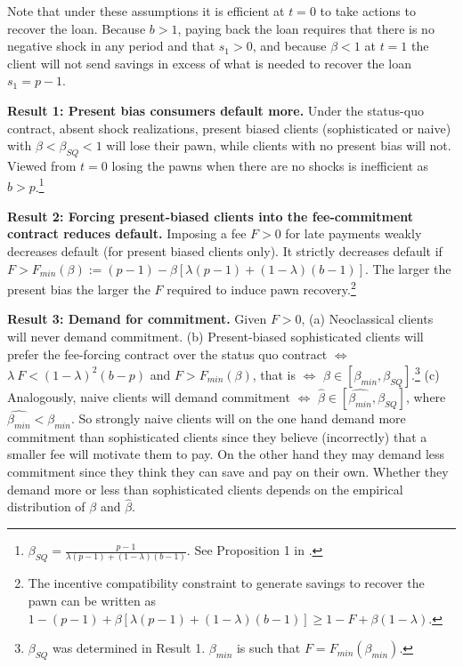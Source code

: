 \documentclass[11pt]{article}
\begin{document}
Note that under these assumptions it is efficient at $t=0$ to take actions to recover the loan. Because $b>1$, paying back the loan requires that there is no negative shock in any period and that $s_1>0$, and because $\beta<1$ at $t=1$ the client will not send savings in excess of what is needed to recover the loan $s_1=p-1$.

\vspace{.1in}
\noindent \textbf{Result 1: Present bias consumers default more.} Under the status-quo contract, absent shock realizations, present biased clients (sophisticated or naive) with $\beta<\beta_{SQ}<1$ will lose their pawn, while clients with no present bias will not. Viewed from $t=0$ losing the pawns when there are no shocks is inefficient as $b>p$.\footnote{$\beta_{SQ}=\frac{p-1}{\lambda(p-1)+(1-\lambda)(b-1)}$. See Proposition 1 in \cite{John}.} 

\vspace{.1in}
\noindent \textbf{Result 2: Forcing present-biased clients into the fee-commitment contract reduces default.} Imposing a fee $F>0$ for late payments weakly decreases default (for present biased clients only). It strictly decreases default if $F>F_{min}(\beta):=(p-1)-\beta[\lambda(p-1)+(1-\lambda)(b-1)]$. The larger the present bias the larger the $F$ required to induce pawn recovery.\footnote{The incentive compatibility constraint to generate savings to recover the pawn can be written as $1-(p-1)+\beta[\lambda(p-1)+(1-\lambda)(b-1)] \geq 1-F+\beta(1-\lambda)$.}

\vspace{.1in}
\noindent \textbf{Result 3: Demand for commitment.} Given $F>0$, (a) Neoclassical clients will never demand commitment. (b) Present-biased sophisticated clients will prefer the fee-forcing contract over the status quo contract $\iff$  $\lambda \: F<(1-\lambda)^2(b-p)$ and $F>F_{min}(\beta)$, that is $\iff$  $\beta \in [\beta_{min},\beta_{SQ}]$.\footnote{$\beta_{SQ}$ was determined in Result 1. $\beta_{min}$ is such that $F=F_{min}(\beta_{min})$.} (c) Analogously, naive clients will demand commitment $\iff$ $\hat{\beta} \in [\widehat{\beta_{min}},\beta_{SQ}]$, where $\widehat{\beta_{min}}<\beta_{min}$. So strongly naive clients will on the one hand demand more commitment than sophisticated clients since they believe (incorrectly) that a smaller fee will motivate them to pay. On the other hand they may demand less commitment since they think they can save and pay on their own. Whether they demand more or less than sophisticated clients depends on the empirical distribution of $\beta$ and $\hat{\beta}$. 
\end{document}

